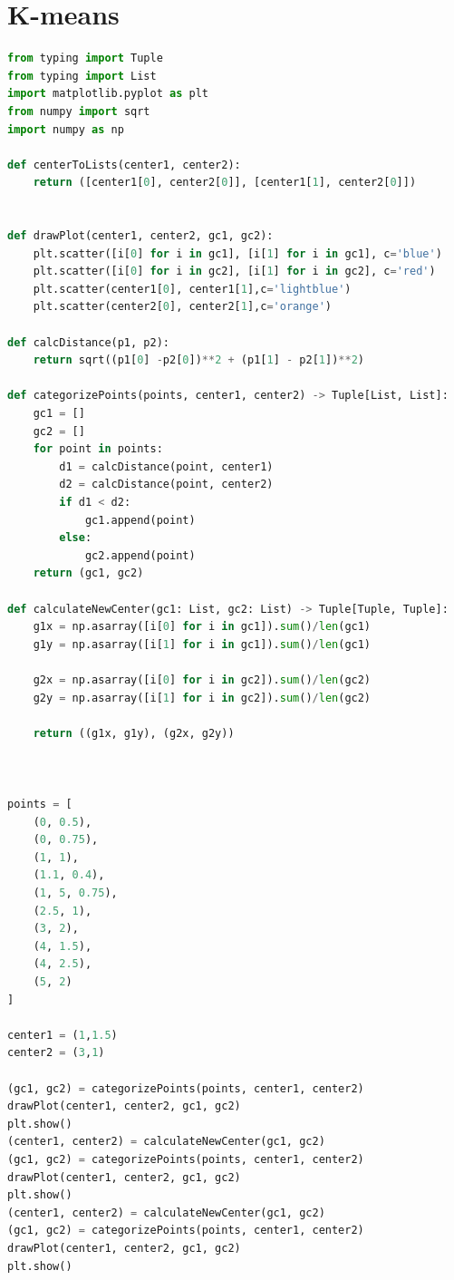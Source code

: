 \documentclass{article}
\begin{document}
\begin{appendices}
\begin{lstlisting}[language=Python]
        \end{lstlisting}
        \section{K-means}
        \label{appendix:kmeans}
        \begin{lstlisting}[language=python]
from typing import Tuple
from typing import List
import matplotlib.pyplot as plt
from numpy import sqrt
import numpy as np

def centerToLists(center1, center2):
    return ([center1[0], center2[0]], [center1[1], center2[0]])


def drawPlot(center1, center2, gc1, gc2):
    plt.scatter([i[0] for i in gc1], [i[1] for i in gc1], c='blue')
    plt.scatter([i[0] for i in gc2], [i[1] for i in gc2], c='red')
    plt.scatter(center1[0], center1[1],c='lightblue')
    plt.scatter(center2[0], center2[1],c='orange')

def calcDistance(p1, p2):
    return sqrt((p1[0] -p2[0])**2 + (p1[1] - p2[1])**2)

def categorizePoints(points, center1, center2) -> Tuple[List, List]:
    gc1 = []
    gc2 = []
    for point in points:
        d1 = calcDistance(point, center1)
        d2 = calcDistance(point, center2)
        if d1 < d2:
            gc1.append(point)
        else:
            gc2.append(point)
    return (gc1, gc2)

def calculateNewCenter(gc1: List, gc2: List) -> Tuple[Tuple, Tuple]:
    g1x = np.asarray([i[0] for i in gc1]).sum()/len(gc1)
    g1y = np.asarray([i[1] for i in gc1]).sum()/len(gc1)

    g2x = np.asarray([i[0] for i in gc2]).sum()/len(gc2)
    g2y = np.asarray([i[1] for i in gc2]).sum()/len(gc2)

    return ((g1x, g1y), (g2x, g2y))
    


points = [
    (0, 0.5),
    (0, 0.75),
    (1, 1),
    (1.1, 0.4),
    (1, 5, 0.75),
    (2.5, 1),
    (3, 2),
    (4, 1.5),
    (4, 2.5),
    (5, 2)
]

center1 = (1,1.5)
center2 = (3,1)

(gc1, gc2) = categorizePoints(points, center1, center2)
drawPlot(center1, center2, gc1, gc2)
plt.show()
(center1, center2) = calculateNewCenter(gc1, gc2)
(gc1, gc2) = categorizePoints(points, center1, center2)
drawPlot(center1, center2, gc1, gc2)
plt.show()
(center1, center2) = calculateNewCenter(gc1, gc2)
(gc1, gc2) = categorizePoints(points, center1, center2)
drawPlot(center1, center2, gc1, gc2)
plt.show()






\end{lstlisting}
\end{appendices}
\end{document}
